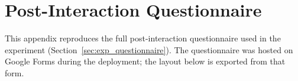\chapter{Post-Interaction Questionnaire}
\label{ch:questionnaire}

This appendix reproduces the full post-interaction questionnaire used in the experiment (Section~\ref{sec:exp_questionnaire}). The questionnaire was hosted on Google Forms during the deployment; the layout below is exported from that form.


